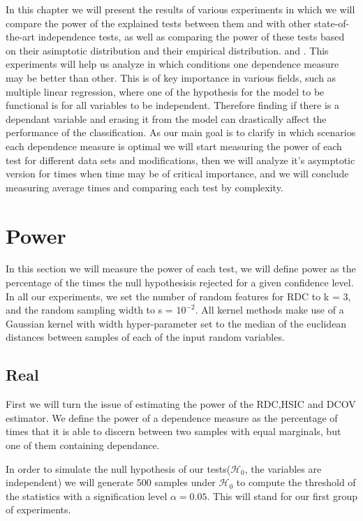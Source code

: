 In this chapter we will present the results of various experiments in which we will compare the power of the explained tests between them and with other state-of-the-art independence tests, as well as comparing the power of these tests based on their asimptotic distribution and their empirical distribution. and \cite{HSICdistribution}. This experiments will help us analyze in which conditions one dependence measure may be better than other.
This is of key importance in various fields, such as multiple linear regression, where one of the hypothesis for the model to be functional is for all variables to be independent. Therefore finding if there is a dependant variable and erasing it from the model can drastically affect the performance of the classification. 
As our main goal is to clarify in which scenarios each dependence measure is optimal we will start measuring the power of each test for different data sets and modifications, then we will analyze it's asymptotic version for times when time may be of critical importance, and we will conclude measuring average times and comparing each test by complexity.

\section{Power}

In this section we will measure the power of each test, we will define power as the percentage of the times the null hypothesisis rejected for a given confidence level.
In all our experiments, we set the number of random features for RDC to k = 3, and the random sampling width to s = $10^{-2}$. All kernel methods make use of a Gaussian kernel with width hyper-parameter set to the median of the euclidean distances between samples of each of the input random variables.

\subsection{Real}
First we will turn the issue of estimating the power of the RDC,HSIC and DCOV estimator. We define the power of a dependence measure as the percentage of times that it is able to discern between two samples with equal marginals, but one of them containing dependance.

In order to simulate the null hypothesis of our tests($\mathcal{H}_{0}$, the variables are independent) we will generate 500 samples under $\mathcal{H}_{0}$ to compute the threshold of the statistics with a signification level $\alpha = 0.05$. This will stand for our first group of experiments.

